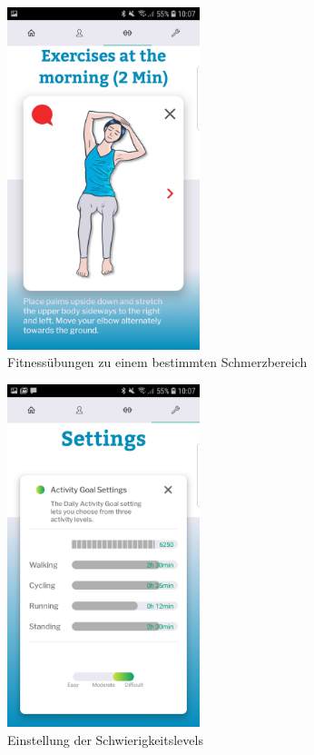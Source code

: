 \begin{figure}[ht]
	\centering
	\includegraphics[width=0.5\textwidth]{excercise.jpg}
	\caption{\label{fig:Fitnesübung}Fitnessübungen zu einem bestimmten Schmerzbereich}
	
\end{figure}

\begin{figure}[ht]
	\centering
	\includegraphics[width=0.5\textwidth]{settings.jpg}
	\caption{\label{fig:GoalSettings}Einstellung der Schwierigkeitslevels}
	
\end{figure}

